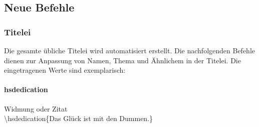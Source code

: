 \subsection{Neue Befehle}
\subsubsection{Titelei}
Die gesamte übliche Titelei wird automatisiert erstellt. Die nachfolgenden
Befehle dienen zur Anpassung von Namen, Thema und Ähnlichem in der Titelei. Die
eingetragenen Werte sind exemplarisch:

\paragraph{hsdedication}
Widmung oder Zitat\\
\textbackslash{}hsdedication\{Das Glück ist mit den Dummen.\}

